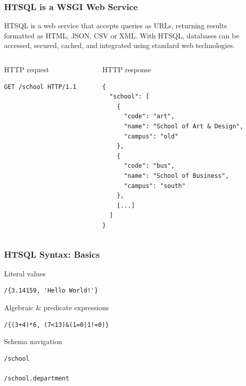 \documentclass{beamer}
\begin{document}
\begin{frame}[containsverbatim]
\frametitle{HTSQL is a WSGI Web Service}
HTSQL is a web service that accepts queries as URLs, returning results
formatted as HTML, JSON, CSV or XML.  With HTSQL, databases can be accessed,
secured, cached, and integrated using standard web technologies.
\begin{columns}[c]
\begin{column}[T]{.5\textwidth}
\begin{block}{HTTP request}
\begin{lstlisting}
GET /school HTTP/1.1
\end{lstlisting}
\end{block}
\end{column}
\begin{column}[T]{.5\textwidth}
\begin{block}{HTTP response}
\tiny
\begin{lstlisting}
{
  "school": [
    {
      "code": "art",
      "name": "School of Art & Design",
      "campus": "old"
    },
    {
      "code": "bus",
      "name": "School of Business",
      "campus": "south"
    },
    [...]
  ]
}
\end{lstlisting}
\end{block}
\end{column}
\end{columns}
\end{frame}

\begin{frame}[containsverbatim]
\frametitle{HTSQL Syntax: Basics}
\begin{block}{Literal values}
\begin{lstlisting}
/{3.14159, 'Hello World!'}
\end{lstlisting}
\end{block}
\begin{block}{Algebraic \& predicate expressions}
\begin{lstlisting}
/{(3+4)*6, (7<13)&(1=0|1!=0)}
\end{lstlisting}
\end{block}
\begin{block}{Schema navigation}
\begin{lstlisting}
/school

/school.department
\end{lstlisting}
\end{block}
\end{frame}
\end{document}
